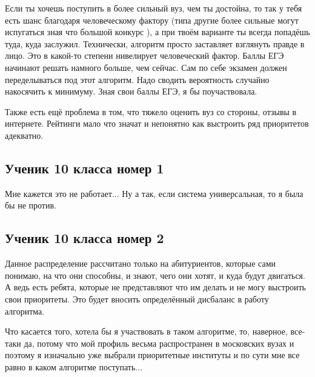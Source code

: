 \documentclass[pdftex, 12pt, a4paper]{article}
\begin{document}
Если ты хочешь поступить в более сильный вуз, чем ты достойна, то так у тебя есть шанс благодаря человеческому фактору (типа другие более сильные могут испугаться зная что большой конкурс ), а при твоём варианте ты всегда попадёшь туда, куда заслужил. Технически, алгоритм просто заставляет взглянуть правде в лицо. Это в какой-то степени нивелирует человеческий фактор. Баллы ЕГЭ начинают решать намного больше, чем сейчас. Сам по себе экзамен должен переделываться под этот алгоритм. Надо сводить вероятность случайно накосячить к минимуму. Зная свои баллы ЕГЭ, я бы поучаствовала. 

Также есть ещё проблема в том, что тяжело оценить вуз со стороны, отзывы в интернете. Рейтинги мало что значат и непонятно как выстроить ряд приоритетов адекватно.


\subsection{Ученик 10 класса номер 1}

Мне кажется это не работает... Ну а так, если система универсальная, то я была бы не против. 

\subsection{Ученик 10 класса номер 2}

Данное распределение рассчитано только на абитуриентов, которые сами понимаю, на что они способны, и знают, чего они хотят, и куда будут двигаться. А ведь есть ребята, которые не представляют что им делать и не могу выстроить свои приоритеты. Это будет вносить определённый дисбаланс в работу алгоритма. 

Что касается того, хотела бы я участвовать в таком алгоритме, то, наверное, все-таки да, потому что мой профиль весьма распространен в московских вузах и поэтому я изначально уже выбрали приоритетные институты и по сути мне все равно в каком алгоритме поступать...




\end{document}
